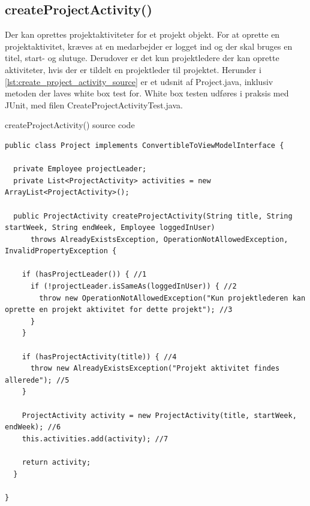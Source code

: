 \subsection{createProjectActivity() \label{chap:white_box_create_project_activity}} 
Der kan oprettes projektaktiviteter for et projekt objekt. For at oprette en projektaktivitet, kræves at en medarbejder er logget ind og der skal bruges en titel, start- og slutuge. Derudover er det kun projektledere der kan oprette aktiviteter, hvis der er tildelt en projektleder til projektet. Herunder i \ref{lst:create_project_activity_source} er et udsnit af Project.java, inklusiv metoden der laves white box test for. White box testen udføres i praksis med JUnit, med filen CreateProjectActivityTest.java.


\begin{listing}[H]
    \centering
    \caption{createProjectActivity() source code}\label{lst:create_project_activity_source}
    \begin{verbatim}
public class Project implements ConvertibleToViewModelInterface {

  private Employee projectLeader;
  private List<ProjectActivity> activities = new ArrayList<ProjectActivity>();

  public ProjectActivity createProjectActivity(String title, String startWeek, String endWeek, Employee loggedInUser)
      throws AlreadyExistsException, OperationNotAllowedException, InvalidPropertyException {
        
    if (hasProjectLeader()) { //1
      if (!projectLeader.isSameAs(loggedInUser)) { //2
        throw new OperationNotAllowedException("Kun projektlederen kan oprette en projekt aktivitet for dette projekt"); //3
      }
    }
    
    if (hasProjectActivity(title)) { //4
      throw new AlreadyExistsException("Projekt aktivitet findes allerede"); //5
    }
    
    ProjectActivity activity = new ProjectActivity(title, startWeek, endWeek); //6
    this.activities.add(activity); //7

    return activity;
  }
  
}

    \end{verbatim}
\end{listing}
